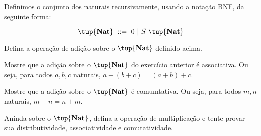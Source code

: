 \begin{definition}[Naturais]
    Definimos o conjunto dos naturais recursivamente, usando a notação BNF, da
    seguinte forma:

    $$ \tup{\textbf{Nat}}\ ::=\ 0\ \vert\ S\ \tup{\textbf{Nat}} $$

\end{definition}

\begin{exercise}
    Defina a operação de adição sobre o $ \tup{\textbf{Nat}} $ definido acima.
\end{exercise}

\begin{exercise}
    Mostre que a adição sobre o $ \tup{\textbf{Nat}} $ do exercício anterior é
    associativa. Ou seja, para todos $a, b, c$ naturais, $a + (b + c) = (a + b)
    + c$.
\end{exercise}

\begin{homework}
    Mostre que a adição sobre o $ \tup{\textbf{Nat}} $ é comumtativa. Ou seja,
    para todos $m, n$ naturais, $m + n = n + m$.
\end{homework}

\begin{homework}
    Aninda sobre o $ \tup{\textbf{Nat}} $, defina a operação de multiplicação e
    tente provar sua distributividade, associatividade e comutatividade.
\end{homework}
